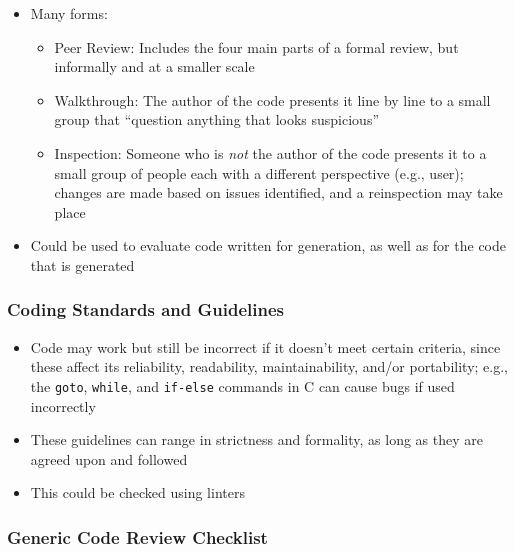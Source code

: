 \begin{itemize}
      \item Many forms:
            \begin{itemize}
                  \item Peer Review: Includes the four main parts of a formal
                        review, but informally and at a smaller scale
                        \cite[p.~94]{patton_software_2006}
                  \item Walkthrough: The author of the code presents it line
                        by line to a small group that ``question anything that
                        looks suspicious'' \cite[p.~95]{patton_software_2006}
                  \item Inspection: Someone who is \emph{not} the author of the
                        code presents it to a small group of people each with a
                        different perspective (e.g., user); changes are made
                        based on issues identified, and a reinspection may take
                        place \cite[p.~95]{patton_software_2006}
            \end{itemize}

      \item Could be used to evaluate code written for generation, as well as
            for the code that is generated
\end{itemize}

\subsubsection{Coding Standards and Guidelines \cite[p.~96-99]{patton_software_2006}}

\begin{itemize}
      \item Code may work but still be incorrect if it doesn't meet certain
            criteria, since these affect its reliability, readability,
            maintainability, and/or portability; e.g., the \texttt{goto},
            \texttt{while}, and \texttt{if-else} commands in C can cause bugs
            if used incorrectly \cite[p.~96]{patton_software_2006}
      \item These guidelines can range in strictness and formality, as long as
            they are agreed upon and followed \cite[p.~96]{patton_software_2006}
      \item This could be checked using linters
\end{itemize}

\subsubsection{Generic Code Review Checklist \cite[p.~99-103]{patton_software_2006}}

